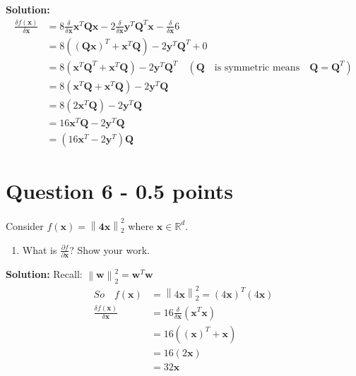 \documentclass[11pt]{article}
\begin{document}
\textbf{Solution:}
\begin{align*}
\frac{\delta f(\mathbf{x})}{\delta \mathbf{x}} &= 8\frac{\delta}{\delta \mathbf{x}} \mathbf{x}^T\mathbf{Q}\mathbf{x}  -2 \frac{\delta}{\delta \mathbf{x}} \mathbf{y}^T\mathbf{Q}^T\mathbf{x} - \frac{\delta}{\delta \mathbf{x}} 6 \\
&= 8((\mathbf{Q}\mathbf{x})^T + \mathbf{x}^T\mathbf{Q})  - 2 \mathbf{y}^T\mathbf{Q}^T + 0 \\
&= 8(\mathbf{x}^T\mathbf{Q}^T + \mathbf{x}^T\mathbf{Q})  - 2 \mathbf{y}^T\mathbf{Q}^T \quad (\mathbf{Q}\quad\textrm{is symmetric means} \quad \mathbf{Q} = \mathbf{Q}^T )\\
&= 8(\mathbf{x}^T\mathbf{Q} + \mathbf{x}^T\mathbf{Q})  - 2 \mathbf{y}^T\mathbf{Q}\\
&= 8(2\mathbf{x}^T\mathbf{Q})  - 2 \mathbf{y}^T\mathbf{Q}\\
&= 16\mathbf{x}^T\mathbf{Q}  - 2 \mathbf{y}^T\mathbf{Q}\\
&= (16\mathbf{x}^T  - 2 \mathbf{y}^T)\mathbf{Q}
\end{align*}

\section*{Question 6 - 0.5 points}
Consider $f(\mathbf{x}) = \left\|\mathbf{4x}\right\|_{2}^{2}$ where $\mathbf{x} \in \mathbb{R}^d$. \begin{enumerate} 
\item What is $\frac{\partial f}{\partial\mathbf{x}}$?  Show your work. 
\end{enumerate}

\textbf{Solution:}
Recall: $\left\|\mathbf{w}\right\|_{2}^{2} = \textbf{w}^T\textbf{w}$
\begin{align*}
So \quad f(\mathbf{x}) &=  \left\|4\mathbf{x}\right\|_{2}^{2} = (4\mathbf{x})^T(4\mathbf{x})\\
\frac{\delta f(\mathbf{x})}{\delta \mathbf{x}} &= 16\frac{\delta}{\delta \mathbf{x}}(\mathbf{x}^T\mathbf{x})\\
&=16((\mathbf{x})^T + \mathbf{x}) \\
&=16(2\mathbf{x})\\
&=32\mathbf{x}
\end{align*}
\end{document}
